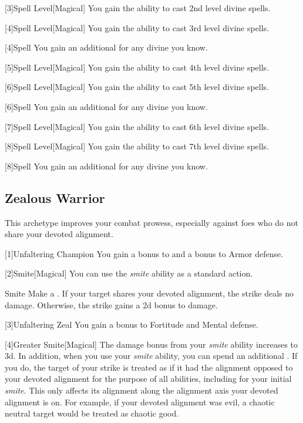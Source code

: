         [3]{Spell Level}[Magical] You gain the ability to cast 2nd level divine spells.

        [4]{Spell Level}[Magical] You gain the ability to cast 3rd level divine spells.

        [4]{Spell} You gain an additional  for any divine  you know.

        [5]{Spell Level}[Magical] You gain the ability to cast 4th level divine spells.

        [6]{Spell Level}[Magical] You gain the ability to cast 5th level divine spells.

        [6]{Spell} You gain an additional  for any divine  you know.

        [7]{Spell Level}[Magical] You gain the ability to cast 6th level divine spells.

        [8]{Spell Level}[Magical] You gain the ability to cast 7th level divine spells.

        [8]{Spell} You gain an additional  for any divine  you know.

    \subsection{Zealous Warrior}
        This archetype improves your combat prowess, especially against foes who do not share your devoted alignment.

        [1]{Unfaltering Champion}
        You gain a  bonus to  and a  bonus to Armor defense.

        [2]{Smite}[Magical] You can use the \textit{smite} ability as a standard action.
        \begin{apability}{Smite}
            Make a .
            If your target shares your devoted alignment, the strike deals no damage.
            Otherwise, the strike gains a \plus2d bonus to damage.
        \end{apability}

        [3]{Unfaltering Zeal}
        You gain a  bonus to Fortitude and Mental defense.

        [4]{Greater Smite}[Magical] The damage bonus from your \textit{smite} ability increases to \plus3d.
        In addition, when you use your \textit{smite} ability, you can spend an additional .
        If you do, the target of your strike is treated as if it had the alignment opposed to your devoted alignment for the purpose of all abilities, including for your initial \textit{smite}.
        This only affects its alignment along the alignment axis your devoted alignment is on.
        For example, if your devoted alignment was evil, a chaotic neutral target would be treated as chaotic good.


